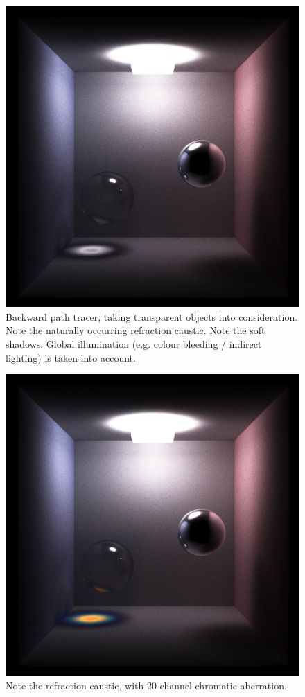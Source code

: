 \documentclass[12pt]{article}
\begin{document}
\begin{figure} 
\centering
  \includegraphics[width = 6 in]{v_rt_reflect_no_chromatic_aberration_low_res.png}
  \caption{  Backward path tracer, taking transparent objects into consideration. 
Note the naturally occurring refraction caustic.
Note the soft shadows.
Global illumination (e.g. colour bleeding / indirect lighting) is taken into account.
}
\end{figure}


\begin{figure} 
\centering
  \includegraphics[width = 6 in]{v_rt_reflect_chromatic_aberration_low_res.png}
  \caption{ Note the refraction caustic, with 20-channel chromatic aberration.
}
\end{figure}
\end{document}

